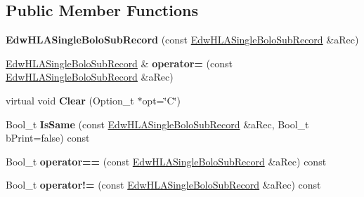 \subsection*{Public Member Functions}
\begin{DoxyCompactItemize}
\item 
\hypertarget{class_edw_h_l_a_single_bolo_sub_record_a1c19ddf8e9cf3970c90c8d8515193b69}{
{\bfseries EdwHLASingleBoloSubRecord} (const \hyperlink{class_edw_h_l_a_single_bolo_sub_record}{EdwHLASingleBoloSubRecord} \&aRec)}
\label{class_edw_h_l_a_single_bolo_sub_record_a1c19ddf8e9cf3970c90c8d8515193b69}

\item 
\hypertarget{class_edw_h_l_a_single_bolo_sub_record_a7feded78ecf3eede11ea3d5ffddd00aa}{
\hyperlink{class_edw_h_l_a_single_bolo_sub_record}{EdwHLASingleBoloSubRecord} \& {\bfseries operator=} (const \hyperlink{class_edw_h_l_a_single_bolo_sub_record}{EdwHLASingleBoloSubRecord} \&aRec)}
\label{class_edw_h_l_a_single_bolo_sub_record_a7feded78ecf3eede11ea3d5ffddd00aa}

\item 
\hypertarget{class_edw_h_l_a_single_bolo_sub_record_acf571e1485a219f441263869779c85ec}{
virtual void {\bfseries Clear} (Option\_\-t $\ast$opt=\char`\"{}C\char`\"{})}
\label{class_edw_h_l_a_single_bolo_sub_record_acf571e1485a219f441263869779c85ec}

\item 
\hypertarget{class_edw_h_l_a_single_bolo_sub_record_a303caa44c59e598c634fe2ed1e5381fc}{
Bool\_\-t {\bfseries IsSame} (const \hyperlink{class_edw_h_l_a_single_bolo_sub_record}{EdwHLASingleBoloSubRecord} \&aRec, Bool\_\-t bPrint=false) const }
\label{class_edw_h_l_a_single_bolo_sub_record_a303caa44c59e598c634fe2ed1e5381fc}

\item 
\hypertarget{class_edw_h_l_a_single_bolo_sub_record_a049ae124f3748e4a4eb70e6642ed5425}{
Bool\_\-t {\bfseries operator==} (const \hyperlink{class_edw_h_l_a_single_bolo_sub_record}{EdwHLASingleBoloSubRecord} \&aRec) const }
\label{class_edw_h_l_a_single_bolo_sub_record_a049ae124f3748e4a4eb70e6642ed5425}

\item 
\hypertarget{class_edw_h_l_a_single_bolo_sub_record_ae12c573fd08ffaa88628c0fbc24d82d3}{
Bool\_\-t {\bfseries operator!=} (const \hyperlink{class_edw_h_l_a_single_bolo_sub_record}{EdwHLASingleBoloSubRecord} \&aRec) const }
\label{class_edw_h_l_a_single_bolo_sub_record_ae12c573fd08ffaa88628c0fbc24d82d3}


\end{DoxyCompactItemize}
